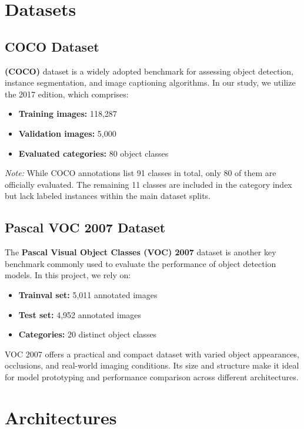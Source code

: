 \documentclass[12pt,a4paper]{article}
\begin{document}
\section{Datasets}

\subsection{COCO Dataset}
 \textbf{(COCO)} dataset is a widely adopted benchmark for assessing object detection, instance segmentation, and image captioning algorithms. In our study, we utilize the 2017 edition, which comprises:
\begin{itemize}
    \item \textbf{Training images:} 118,287
    \item \textbf{Validation images:} 5,000
    \item \textbf{Evaluated categories:} 80 object classes
\end{itemize}

\textit{Note:} While COCO annotations list 91 classes in total, only 80 of them are officially evaluated. The remaining 11 classes are included in the category index but lack labeled instances within the main dataset splits.

\subsection{Pascal VOC 2007 Dataset}
The \textbf{Pascal Visual Object Classes (VOC) 2007} dataset is another key benchmark commonly used to evaluate the performance of object detection models. In this project, we rely on:
\begin{itemize}
    \item \textbf{Trainval set:} 5,011 annotated images
    \item \textbf{Test set:} 4,952 annotated images
    \item \textbf{Categories:} 20 distinct object classes
\end{itemize}

VOC 2007 offers a practical and compact dataset with varied object appearances, occlusions, and real-world imaging conditions. Its size and structure make it ideal for model prototyping and performance comparison across different architectures.

\section{Architectures}
\end{document}
